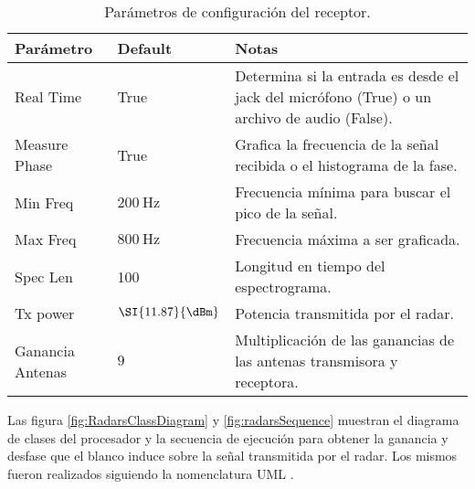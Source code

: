 \begin{table}[htb]
  \caption{Parámetros de configuración del receptor.}
  \centering
  \label{tab:radarParameters}
  \begin{tabular}{l l p{9cm}}
  \toprule
  \textbf{Parámetro} & \textbf{Default} & \textbf{Notas} \tabularnewline
  \midrule
  Real Time & True & Determina si la entrada es desde el jack del micrófono (True) o un archivo de audio (False). \tabularnewline

  Measure Phase & True & Grafica la frecuencia de la señal recibida o el histograma de la fase. \tabularnewline

  Min Freq & $\SI{200}{\hertz}$ & Frecuencia mínima para buscar el pico de la señal. \tabularnewline

  Max Freq & $\SI{800}{\hertz}$ & Frecuencia máxima a ser graficada. \tabularnewline

  Spec Len & 100 & Longitud en tiempo del espectrograma. \tabularnewline

  Tx power & $\SI{11.87}{\dBm}$ & Potencia transmitida por el radar. \tabularnewline

  Ganancia Antenas & $9$ & Multiplicación de las ganancias de las antenas transmisora y receptora. \tabularnewline
  \bottomrule 
  \end{tabular}
\end{table}

Las figura \ref{fig:RadarsClassDiagram} y \ref{fig:radarsSequence} muestran el diagrama de clases del procesador y la secuencia de ejecución para obtener la ganancia y desfase que el blanco induce sobre la señal transmitida por el radar. Los mismos fueron realizados  siguiendo la nomenclatura UML \cite{uml2.5}. 

